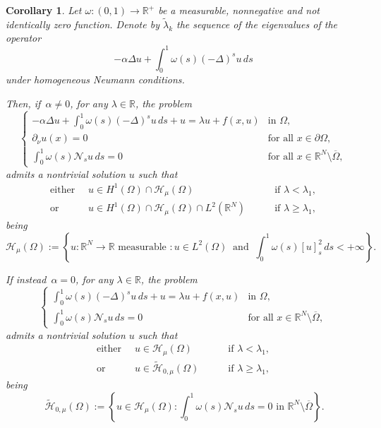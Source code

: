 \documentclass[12pt,a4paper,intlimits,sumlimits]{amsart}
\def \R {\mathbb{R}}
\def \Ns {\mathscr{N}_{s}}
\theoremstyle{definition}
\theoremstyle{plain}
\newtheorem{corollary}[definition]{Corollary}
\numberwithin{equation}{section}
\renewcommand{\ge}{\geqslant}
\begin{document}
\begin{corollary}\label{cor4}
Let $\omega:(0, 1)\to\R^+$ be a measurable, nonnegative and not identically zero function.  Denote by $\widetilde\lambda_k$ the sequence of the eigenvalues of the operator
\begin{equation}\label{intoperator}
-\alpha\Delta  u + \displaystyle\int_0^1 \omega(s) (-\Delta)^s u\, ds
\end{equation}
under homogeneous Neumann conditions.

Then, if~$\alpha\neq 0$, for any $\lambda\in\R$, the problem
\begin{equation}\label{P41}
\begin{cases}
-\alpha\Delta  u + \displaystyle\int_0^1 \omega(s) (-\Delta)^s u\, ds +u=\lambda u +f(x,u)  &\mbox{in }\Omega,\\
\partial_\nu u(x)=0  &\mbox{for all } x\in \partial\Omega,\\
\displaystyle\int_0^1 \omega(s) \Ns u\, ds=0 &\mbox{for all }x\in \R^N \setminus \overline{\Omega}, 
\end{cases}
\end{equation}
admits a nontrivial solution $u$ such that
\begin{equation}\label{spazicor4}
\begin{alignedat}{2}
\mbox{either } \ & u\in H^1(\Omega)\cap \mathcal H_\mu (\Omega) \quad&&\mbox{ if } \lambda<\lambda_1,\\
\mbox{or } \ &u\in H^1(\Omega)\cap \mathcal H_\mu (\Omega)\cap L^2(\R^N) \quad&&\mbox{ if } \lambda\ge\lambda_1,
\end{alignedat}
\end{equation}
being 
\[
\mathcal H_\mu (\Omega):= \left\lbrace u:\R^N\to\R \text{ measurable } : u\in L^2(\Omega) \ \mbox{ and } \ \int_0^1 \omega(s) [u]_s^2 \, ds <+\infty \right\rbrace.
\]

If instead~$\alpha=0$, for any $\lambda\in\R$, the problem
\begin{equation}\label{P42}
\begin{cases}
\displaystyle\int_0^1 \omega(s) (-\Delta)^s u\, ds +u=\lambda u +f(x,u)  &\mbox{in }\Omega,\\
\displaystyle\int_0^1 \omega(s) \Ns u\, ds=0  &\mbox{for all }x\in \R^N \setminus \overline{\Omega}, 
\end{cases}
\end{equation}
admits a nontrivial solution $u$ such that
\begin{equation}\label{spazicor44}
\begin{alignedat}{2}
\mbox{either } \ & u\in \mathcal H_\mu (\Omega)  \quad&&\mbox{ if } \lambda<\lambda_1,\\
\mbox{or } \ &u\in \widetilde{\mathcal H}_{0, \mu} (\Omega) \quad&&\mbox{ if } \lambda\ge\lambda_1,
\end{alignedat}
\end{equation}
being
\[\
\widetilde{\mathcal H}_{0, \mu}(\Omega):=\left\{u\in \mathcal H_{\mu}(\Omega) :\displaystyle\int_0^1 \omega(s) \Ns u\, ds=0 \mbox{ in }\R^N\setminus \overline{\Omega}\right\}.
\]
\end{corollary}
\end{document}
